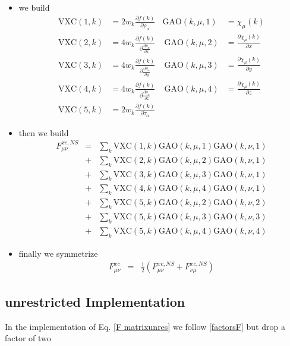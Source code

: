 \documentclass[preprint,preprintnumbers,amsmath,amssymb,11pt]{revtex4}
\begin{document}
\begin{itemize}
\item
we build
\begin{eqnarray}\label{F matrix566}
\mathrm{VXC}(1,k) &= 2 w_{k} \frac{\partial f(k)}{\partial \rho_{\alpha}}  \ \ \ \  \mathrm{GAO}(k,\mu,1) & = \chi_{\mu}(k)\\
\mathrm{VXC}(2,k) &= 4 w_{k} \frac{\partial f(k)}{\partial \frac{\partial \rho_{\alpha}}{\partial x}}   \ \ \ \ \ \mathrm{GAO}(k,\mu,2) & = \frac{\partial \chi_{\mu}(k)}{\partial x}\\
\mathrm{VXC}(3,k) &= 4 w_{k} \frac{\partial f(k)}{\partial \frac{\partial \rho_{\alpha}}{\partial y}}   \ \ \ \ \ \mathrm{GAO}(k,\mu,3) & = \frac{\partial \chi_{\mu}(k)}{\partial y}\\
\mathrm{VXC}(4,k) &= 4 w_{k} \frac{\partial f(k)}{\partial \frac{\partial \rho_{\alpha}}{\partial z}}   \ \ \ \ \ \mathrm{GAO}(k,\mu,4) & = \frac{\partial \chi_{\mu}(k)}{\partial z}\\
\mathrm{VXC}(5,k) &= 2 w_{k} \frac{\partial f(k)}{\partial \tau_{\alpha}} \ \ \ \ \ \phantom{ \mathrm{GAO}(k,\mu,4)}& 
\end{eqnarray}
\item
then we build
\begin{eqnarray} \label{factorsF}
F^{xc,NS}_{\mu \nu} &=&  \sum_{k} \mathrm{VXC}(1,k) \mathrm{GAO}(k,\mu,1) \mathrm{GAO}(k,\nu,1)\\
&+& \sum_{k} \mathrm{VXC}(2,k) \mathrm{GAO}(k,\mu,2)\mathrm{GAO}(k,\nu,1)\\
&+& \sum_{k} \mathrm{VXC}(3,k) \mathrm{GAO}(k,\mu,3)\mathrm{GAO}(k,\nu,1)\\ 
&+& \sum_{k} \mathrm{VXC}(4,k) \mathrm{GAO}(k,\mu,4)\mathrm{GAO}(k,\nu,1)\\ 
&+& \sum_{k} \mathrm{VXC}(5,k) \mathrm{GAO}(k,\mu,2)\mathrm{GAO}(k,\nu,2)\\ 
&+& \sum_{k} \mathrm{VXC}(5,k) \mathrm{GAO}(k,\mu,3)\mathrm{GAO}(k,\nu,3)\\ 
&+& \sum_{k} \mathrm{VXC}(5,k) \mathrm{GAO}(k,\mu,4)\mathrm{GAO}(k,\nu,4)
\end{eqnarray}
\item
finally we symmetrize
\begin{eqnarray}
F^{xc}_{\mu \nu} &=& \frac{1}{2}\left( F^{xc,NS}_{\mu \nu} + F^{xc,NS}_{\nu \mu}  \right)
\end{eqnarray}
\end{itemize}
\subsection{unrestricted Implementation}
In the implementation of Eq. \eqref{F matrixunres} we follow \eqref{factorsF} but drop a factor of two
\end{document}
